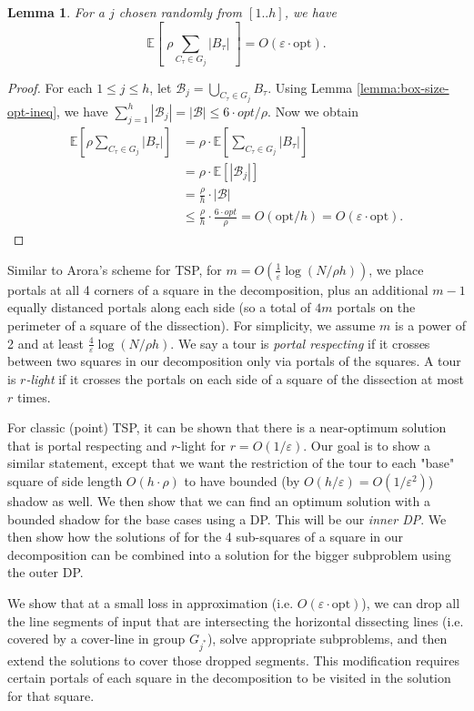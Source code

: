 \documentclass[10pt,a4paper]{amsart}
\theoremstyle{thmstyleone}
\newtheorem{lemma}{Lemma}
\newcommand{\eps}{\varepsilon}
\newcommand{\opt}{{\text{opt}}}
\newcommand{\abs}[1]{\left.|#1|\right.}
\newcommand{\E}{\mathbb{E}}
\begin{document}
\begin{lemma}\label{lem:cover-line-group}
    For a $j$ chosen randomly from $[1..h]$, we have 
    \[
        \E[\; \rho\sum_{C_\tau\in G_j}|B_\tau|\; ]=O(\eps\cdot\opt).
    \]
\end{lemma}
\begin{proof}
    For each $1 \le j \le h$, let $\mathcal B_j = \bigcup_{C_\tau\in G_j}{B_\tau}$. Using Lemma \ref{lemma:box-size-opt-ineq}, we have $\sum_{j = 1}^h \abs{\mathcal B_j} = \abs{\mathcal B} \le 6\cdot opt / \rho$. Now we obtain
    \begin{align*}
        \E[\rho \sum_{C_\tau\in G_j}\abs{B_\tau}] &= \rho\cdot \E[\sum_{C_\tau\in G_j}\abs{B_\tau}]\\
        &= \rho \cdot \E[\abs{\mathcal B_j}] \\
        &= \frac{\rho}{h}\cdot|\mathcal B|\\
        &\le \frac{\rho}{h} \cdot \frac{6\cdot opt}{\rho}  = O(\opt/h) = O(\eps\cdot \opt).
    \end{align*}
\end{proof}


Similar to Arora's scheme for TSP, for $m=O(\frac{1}{\eps}\log(N/\rho h))$, we place portals at all 4 corners of a square in the decomposition, plus an additional $m - 1$ equally distanced portals along each side (so a total of $4m$ portals on the perimeter of a square of the dissection). For simplicity, we assume $m$ is a power of 2 and at least $\frac{4}{\eps}\log(N/\rho h)$.
We say a tour is {\em portal respecting} if it crosses between two squares in our decomposition only via portals of the squares. A tour is {\em $r$-light} if it crosses the portals on each side of a square of the dissection at most $r$ times.

For classic (point) TSP, it can be shown that there is a near-optimum solution that is portal respecting and $r$-light for $r=O(1/\eps)$. Our goal is to
show a similar statement, except that we want the restriction of the tour to each "base" square of side length $O(h\cdot\rho)$ to have bounded (by $O(h/\eps)=O(1/\eps^2)$) shadow as well. We then show that we can find an optimum solution with a bounded shadow for the base cases using a DP. This will be our {\em inner DP}. We then show how the solutions of for the 4 sub-squares of a square in our decomposition can be combined into a solution for the bigger subproblem using the outer DP.

We show that at a small loss in approximation (i.e. $O(\eps\cdot\opt)$), we can drop all the line segments of input that are intersecting the horizontal dissecting lines (i.e. covered by a cover-line in group $G_{j^*}$), solve appropriate subproblems, and then extend the solutions to cover those dropped segments. This modification requires certain portals of each square in the decomposition to be visited in the solution for that square.
\end{document}
